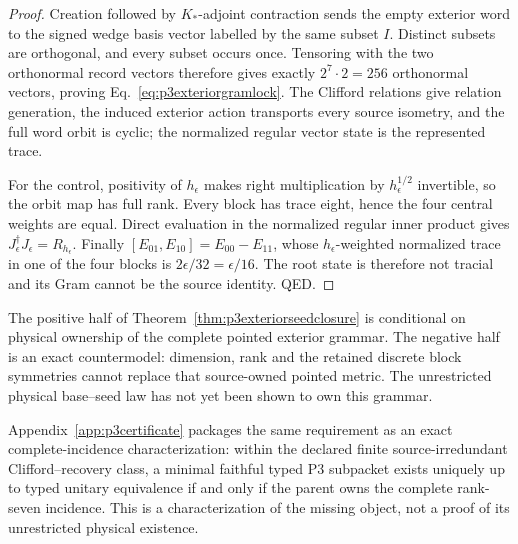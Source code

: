 \begin{proof}
Creation followed by $K_*$-adjoint contraction sends the empty exterior word
to the signed wedge basis vector labelled by the same subset $I$.  Distinct
subsets are orthogonal, and every subset occurs once.  Tensoring with the two
orthonormal record vectors therefore gives exactly $2^7\cdot2=256$
orthonormal vectors, proving Eq.~\eqref{eq:p3exteriorgramlock}.  The Clifford
relations give relation generation, the induced exterior action transports
every source isometry, and the full word orbit is cyclic; the normalized
regular vector state is the represented trace.

For the control, positivity of $h_\epsilon$ makes right multiplication by
$h_\epsilon^{1/2}$ invertible, so the orbit map has full rank.  Every block
has trace eight, hence the four central weights are equal.  Direct evaluation
in the normalized regular inner product gives
$J_\epsilon^\dagger J_\epsilon=R_{h_\epsilon}$.  Finally
$[E_{01},E_{10}]=E_{00}-E_{11}$, whose $h_\epsilon$-weighted normalized trace
in one of the four blocks is $2\epsilon/32=\epsilon/16$.  The root state is
therefore not tracial and its Gram cannot be the source identity. QED.
\end{proof}

The positive half of Theorem~\ref{thm:p3exteriorseedclosure} is conditional
on physical ownership of the complete pointed exterior grammar.  The
negative half is an exact countermodel: dimension, rank and the retained
discrete block symmetries cannot replace that source-owned pointed metric.
The unrestricted physical base--seed law has not yet been shown to own this
grammar.


Appendix~\ref{app:p3certificate} packages the same requirement as an exact
complete-incidence characterization: within the declared finite
source-irredundant Clifford--recovery class, a minimal faithful typed P3
subpacket exists uniquely up to typed unitary equivalence if and only if the
parent owns the complete rank-seven incidence.  This is a characterization of
the missing object, not a proof of its unrestricted physical existence.


